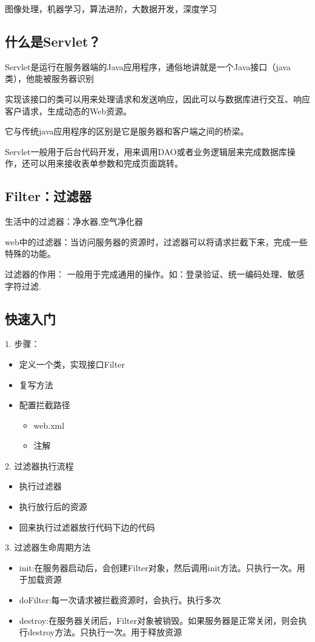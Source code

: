\documentclass{article}
\begin{document}
       图像处理，机器学习，算法进阶，大数据开发，深度学习
  \subsection{什么是Servlet？} 
Servlet是运行在服务器端的Java应用程序，通俗地讲就是一个Java接口（java类），他能被服务器识别

实现该接口的类可以用来处理请求和发送响应，因此可以与数据库进行交互、响应客户请求，生成动态的Web资源。

它与传统java应用程序的区别是它是服务器和客户端之间的桥梁。

Servlet一般用于后台代码开发，用来调用DAO或者业务逻辑层来完成数据库操作，还可以用来接收表单参数和完成页面跳转。

\subsection{Filter：过滤器 } 
生活中的过滤器：净水器,空气净化器

  web中的过滤器：当访问服务器的资源时，过滤器可以将请求拦截下来，完成一些特殊的功能。

  过滤器的作用：
    一般用于完成通用的操作。如：登录验证、统一编码处理、敏感字符过滤.
\subsection{快速入门} 
  1. 步骤：
    \begin{itemize}

    \item 定义一个类，实现接口Filter
    \item 复写方法
    \item 配置拦截路径
    \begin{itemize}
    \item web.xml 
    \item 注解
    \end{itemize}
  \end{itemize}

  2. 过滤器执行流程
      \begin{itemize}
    \item 执行过滤器
    \item 执行放行后的资源
    \item 回来执行过滤器放行代码下边的代码
    \end{itemize}

  3. 过滤器生命周期方法
      \begin{itemize}
    \item init:在服务器启动后，会创建Filter对象，然后调用init方法。只执行一次。用于加载资源
    \item doFilter:每一次请求被拦截资源时，会执行。执行多次
    \item destroy:在服务器关闭后，Filter对象被销毁。如果服务器是正常关闭，则会执行destroy方法。只执行一次。用于释放资源
    \end{itemize}
\end{document}
